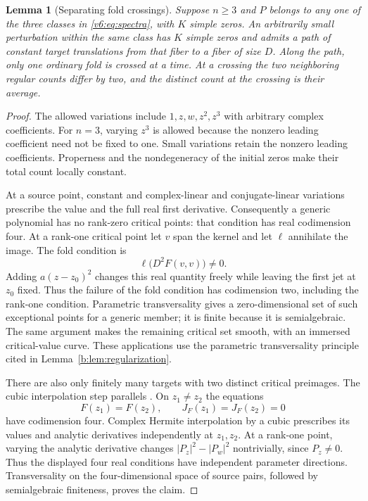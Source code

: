 \documentclass[UTF8,11pt]{ctexart}
\newtheorem{lem}[thm]{Lemma}
\theoremstyle{definition}
\numberwithin{equation}{section}
\begin{document}
\begin{lem}[Separating fold crossings]\label{v6:lem:foldpath}
Suppose $n\ge3$ and $P$ belongs to any one of the three classes in
\eqref{v6:eq:spectra}, with $K$ simple zeros. An arbitrarily small
perturbation within the same class has $K$ simple zeros and admits
a path of constant target translations from that fiber to a fiber
of size $D$. Along the path, only one ordinary fold is crossed at
a time. At a crossing the two neighboring regular counts differ
by two, and the distinct count at the crossing is their average.
\end{lem}
\begin{proof}
The allowed variations include $1,z,w,z^2,z^3$ with arbitrary
complex coefficients. For $n=3$, varying $z^3$ is allowed because
the nonzero leading coefficient need not be fixed to one. Small
variations retain the nonzero leading coefficients. Properness and
the nondegeneracy of the initial zeros make their total count
locally constant.

At a source point, constant and complex-linear and conjugate-linear
variations prescribe the value and the full real first derivative.
Consequently a generic polynomial has no rank-zero critical points:
that condition has real codimension four. At a rank-one critical
point let $v$ span the kernel and let $\ell$ annihilate the image.
The fold condition is
\[
 \ell\bigl(D^2F(v,v)\bigr)\ne0.
\]
Adding $a(z-z_0)^2$ changes this real quantity freely while leaving
the first jet at $z_0$ fixed. Thus the failure of the fold condition
has codimension two, including the rank-one condition. Parametric
transversality gives a zero-dimensional set of such exceptional
points for a generic member; it is finite because it is semialgebraic.
The same argument makes the remaining critical set smooth, with
an immersed critical-value curve. These applications use the
parametric transversality principle cited in
Lemma~\ref{b:lem:regularization}.

There are also only finitely many targets with two distinct critical
preimages. The cubic interpolation step parallels
\cite[Lemma~5.2, \av, p.~23]{SZ21}. On $z_1\ne z_2$ the equations
\[
 F(z_1)=F(z_2),\qquad J_F(z_1)=J_F(z_2)=0
\]
have codimension four. Complex Hermite interpolation by a cubic
prescribes its values and analytic derivatives independently at
$z_1,z_2$. At a rank-one point, varying the analytic derivative
changes $|P_z|^2-|P_w|^2$ nontrivially, since $P_z\ne0$.
Thus the displayed four real conditions have independent parameter
directions. Transversality on the four-dimensional space of source
pairs, followed by semialgebraic finiteness, proves the claim.


\end{proof}
\end{document}
